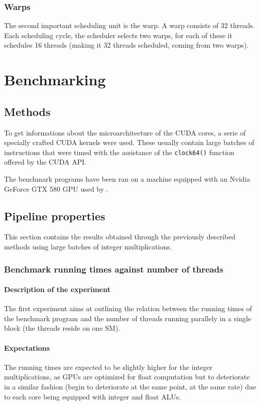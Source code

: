 \documentclass{report}
\begin{document}
        \subsection{Warps}
        The second important scheduling unit is the warp. A warp consists
        of 32 threads. Each scheduling cycle, the scheduler selects two
        warps, for each of these it schedules 16 threads (making it 32
        threads scheduled, coming from two warps)\cite{cudaprog}.

\chapter{Benchmarking}

\section{Methods}
	To get informations about the microarchitecture of the CUDA cores, a serie 
    of specially crafted CUDA kernels were used. These usually contain large 
    batches of instructions that were timed with the assistance of the \texttt{clock64()} 
    function offered by the CUDA API.

	The benchmark programs have been ran on a machine equipped with an Nvidia
    GeForce GTX 580 GPU used by \cite{cofact14}.

\section{Pipeline properties}
	This section contains the results obtained through the previously described
	methods using large batches of integer multiplications.

	\subsection{Benchmark running times against number of threads}
	\label{par:pipeline_exp}
	\subsubsection{Description of the experiment}
	The first experiment aims at outlining the relation between the running
    times of the benchmark program and the number of threads running parallely in
    a single block (the threads reside on one SM).
	\subsubsection{Expectations}
    The running times are expected to be slightly higher for the integer
    multiplications, as GPUs are optimized for float computation
    but to deteriorate in a similar fashion (begin to deteriorate
    at the same point, at the same rate) due to each core being equipped with
    integer and float ALUs.
    
\end{document}
